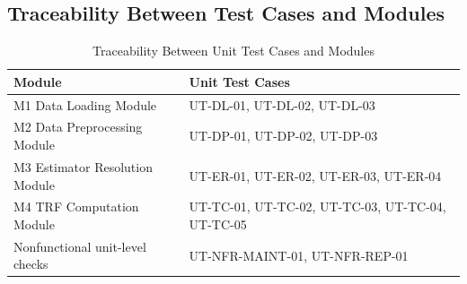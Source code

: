 \documentclass[12pt, titlepage]{article}
\begin{document}
\subsection{Traceability Between Test Cases and Modules}

\begin{table}[h!]
\centering
\begin{tabularx}{\textwidth}{p{}X}
\toprule
\textbf{Module} & \textbf{Unit Test Cases} \\
\midrule
M1 Data Loading Module & UT-DL-01, UT-DL-02, UT-DL-03 \\
M2 Data Preprocessing Module & UT-DP-01, UT-DP-02, UT-DP-03 \\
M3 Estimator Resolution Module & UT-ER-01, UT-ER-02, UT-ER-03, UT-ER-04 \\
M4 TRF Computation Module & UT-TC-01, UT-TC-02, UT-TC-03, UT-TC-04, UT-TC-05 \\
Nonfunctional unit-level checks & UT-NFR-MAINT-01, UT-NFR-REP-01 \\
\bottomrule
\end{tabularx}
\caption{Traceability Between Unit Test Cases and Modules}
\label{tab:unit-module-trace}
\end{table}




\end{document}
